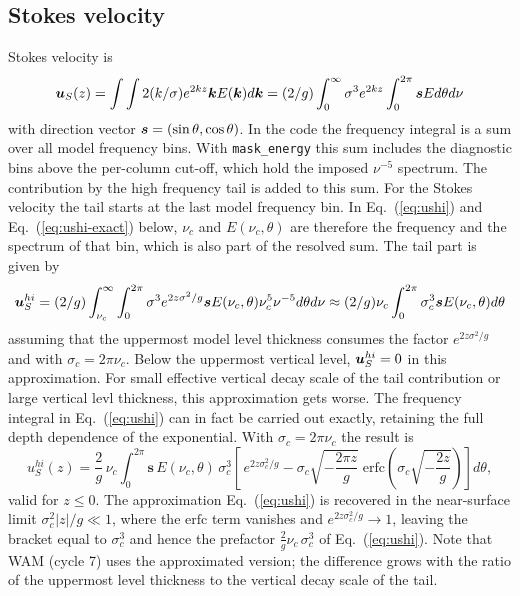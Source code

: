 \documentclass[12pt]{article}
\newcommand{\beq}  { \begin{eqnarray} }
\newcommand{\eeq}  { \end{eqnarray}}
\newcommand{\eq }  [1]{Eq.~(\ref{#1})}  %
\renewcommand{\v}[1]{{\mbox{\boldmath$ #1 $}}}  %
\newcommand{\erfc}{\mathrm{erfc}}
\begin{document}
\subsection*{Stokes velocity}

Stokes velocity is  
\beq
\v u_S(z) =  \int \int 2 (k/\sigma) e^{2kz} \v k   E(\v k)  d \v k  
= (2/g) \int_0^\infty  \sigma^3  e^{2k z } \int_0^{2 \pi}   \v s E  d\theta d \nu 
\eeq
with direction vector $\v s=(\sin \theta,\cos \theta)$.
In the code the frequency integral is a sum over all model frequency bins.
With \verb|mask_energy| this sum includes the diagnostic bins above the
per-column cut-off, which hold the imposed $\nu^{-5}$ spectrum.
The contribution by the high frequency tail is added to this sum.
For the Stokes velocity the tail starts at the last model frequency bin.
In \eq{eq:ushi} and \eq{eq:ushi-exact} below, $\nu_c$ and $E(\nu_c,\theta)$
are therefore the frequency and the spectrum of that bin, which is also part
of the resolved sum.
The tail part is given by
  \beq \label{eq:ushi}
  \v u_S^{hi} = 
  (2/g) \int_{\nu_c}^\infty \int_0^{2 \pi}    \sigma^3  e^{2z \sigma^2/g}    \v s  E(\nu_c,\theta)  \nu_c^5  \nu^{-5} d\theta d \nu 
  \approx  (2/g)  \nu_c  \int_0^{2 \pi}   \sigma_c^3 \v s  E(\nu_c,\theta)  d\theta
 \eeq 
 assuming that the uppermost model level thickness consumes the factor $ e^{2z \sigma^2/g} $
 and with $\sigma_c = 2 \pi \nu_c$. Below the uppermost vertical level, $  \v u_S^{hi} =0$ in this
 approximation.
 For small effective vertical decay scale of the tail contribution or large
 vertical levl thickness, this approximation
 gets worse.
The frequency integral in \eq{eq:ushi} can in fact be carried out
exactly, retaining the full depth dependence of the exponential. With
$\sigma_c = 2\pi \nu_c$ the result is
%
\begin{equation}
  u_S^{hi}(z)
  = \frac{2}{g}\, \nu_c \int_0^{2\pi}\! \mathbf{s}\,E(\nu_c,\theta)\,
    \sigma_c^{3}\left[\,
      e^{2z\sigma_c^{2}/g}
      - \sigma_c\sqrt{-\frac{2\pi z}{g}}\;
        \erfc\!\left(\sigma_c\sqrt{-\frac{2z}{g}}\right)
    \right] d\theta ,
  \label{eq:ushi-exact}
\end{equation}
%
valid for $z\le 0$. The approximation \eq{eq:ushi} is recovered in the
near-surface limit $\sigma_c^{2}|z|/g \ll 1$, where the $\erfc$ term
vanishes and $e^{2z\sigma_c^{2}/g}\to 1$, leaving the bracket equal to
$\sigma_c^{3}$ and hence the prefactor $\frac{2}{g}\nu_c\,\sigma_c^{3}$ of
\eq{eq:ushi}. Note that WAM (cycle 7) uses the approximated version;
the difference grows with the ratio of the uppermost level thickness to the
vertical decay scale of the tail.
 
\end{document}

